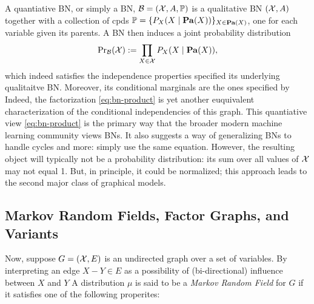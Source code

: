 A quantiative BN, or simply a BN, 
    $\mathcal B = (\mathcal X, A, \mathbb P)$ 
    is a qualitative BN $(\mathcal X, A)$ together with a collection 
    of cpds $\mathbb P = \{ P_X( X \mid \mathop{\mathbf{Pa}}\nolimits(X)) \}_{X \in \mathop{\mathbf{Pa}}\nolimits(X)}$,
    one for each variable given its parents. 
A BN then induces a joint probability distribution 
\begin{equation}
    \Pr\nolimits_{\cal B}(\mathcal X) := \prod_{X \in \mathcal X} P_X( X \mid \mathop{\mathbf{Pa}}\nolimits(X) ),
        \label{eq:bn-product}
\end{equation}
which indeed satisfies the independence properties specified its underlying qualitaitve BN. Moreover, its conditional marginals are the ones specified by 
Indeed, the factorization \eqref{eq:bn-product} is yet another euquivalent characterization of the conditional independencies of this graph.  
This quantiative view \eqref{eq:bn-product} is the primary way that the broader modern machine learning community views BNs.
It also suggests a way of generalizing BNs to handle cycles and more: simply use the same equation.
However, the resulting object will typically not be a probability distribution: its sum over all values of $\mathcal X$ may not equal 1. 
But, in principle, it could be normalized;
    this approach leads to the second major class of graphical models.  



\subsection{Markov Random Fields, Factor Graphs, and Variants}
    \label{sec:prelim-fgs}

Now, suppose $G = (\mathcal X, E)$ is an undirected graph over a set of variables.
By interpreting an edge $X{-}Y \in E$ as a possibility of (bi-directional) influence between $X$ and $Y$
A distribution $\mu$ is said to be a \emph{Markov Random Field} for $G$ if it satisfies one of the following properites:

